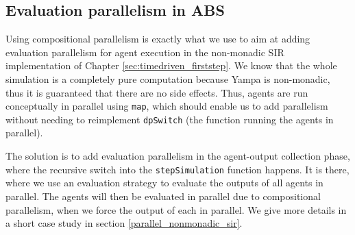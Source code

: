 \subsection{Evaluation parallelism in ABS}
Using compositional parallelism is exactly what we use to aim at adding evaluation parallelism for agent execution in the non-monadic SIR implementation of Chapter \ref{sec:timedriven_firststep}. We know that the whole simulation is a completely pure computation because Yampa is non-monadic, thus it is guaranteed that there are no side effects. Thus, agents are run conceptually in parallel using \texttt{map}, which should enable us to add parallelism without needing to reimplement \texttt{dpSwitch} (the function running the agents in parallel). %

The solution is to add evaluation parallelism in the agent-output collection phase, where the recursive switch into the \texttt{stepSimulation} function happens. It is there, where we use an evaluation strategy to evaluate the outputs of all agents in parallel. The agents will then be evaluated in parallel due to compositional parallelism, when we force the output of each in parallel. We give more details in a short case study in section \ref{parallel_nonmonadic_sir}.